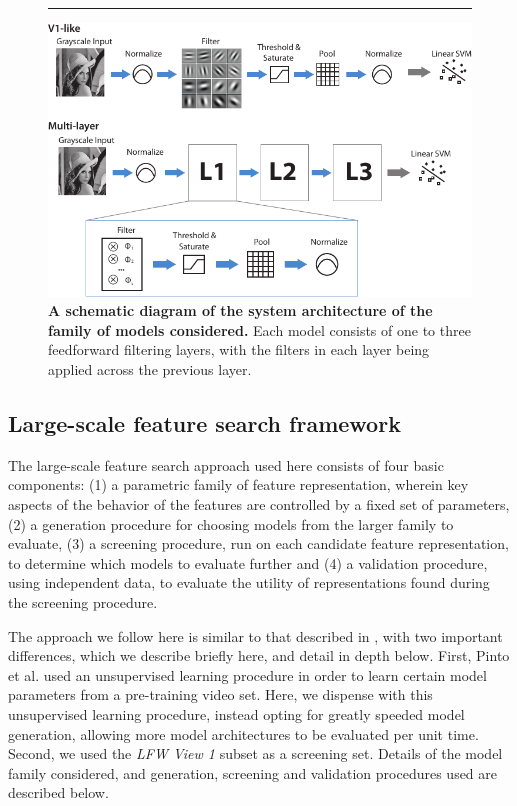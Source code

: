 
\begin{figure}[ht]
\begin{center}
	\rule{1\linewidth}{0pt}
        \includegraphics[width=1\linewidth]{figures/models_v2.pdf}
\end{center}
   \caption{{\bf A schematic diagram of the system architecture of the family of
       models considered.}  Each model consists of one to three feedforward
     filtering layers, with the filters in each layer being applied across the
     previous layer.}
\label{fig:models}
\end{figure}



\subsection{Large-scale feature search framework}
\label{sec:feature_search}

The large-scale feature search approach used here consists of four basic components:
(1) a parametric family of feature representation, wherein key aspects of the behavior of the 
features are controlled by a fixed set of parameters, (2) a generation procedure for 
choosing models from the larger family to evaluate, (3) a screening procedure, run on 
each candidate feature representation, to determine which models to evaluate further
and (4) a validation procedure, using independent data, to evaluate the utility of representations found
during the screening procedure.

The approach we follow here is similar to that described in \cite{pinto:plos09},
with two important differences, which we describe briefly here, and detail in depth below.
First, Pinto et al. \cite{pinto:plos09} used an unsupervised learning procedure in 
order to learn certain model parameters from a pre-training video set.  Here, we dispense with 
this unsupervised learning procedure, instead opting for greatly speeded model generation, allowing
more model architectures to be evaluated per unit time.  Second, we used the \emph{LFW View 1} subset 
as a screening set.  Details of the model family considered, and generation, screening and validation  
procedures used are described below.


